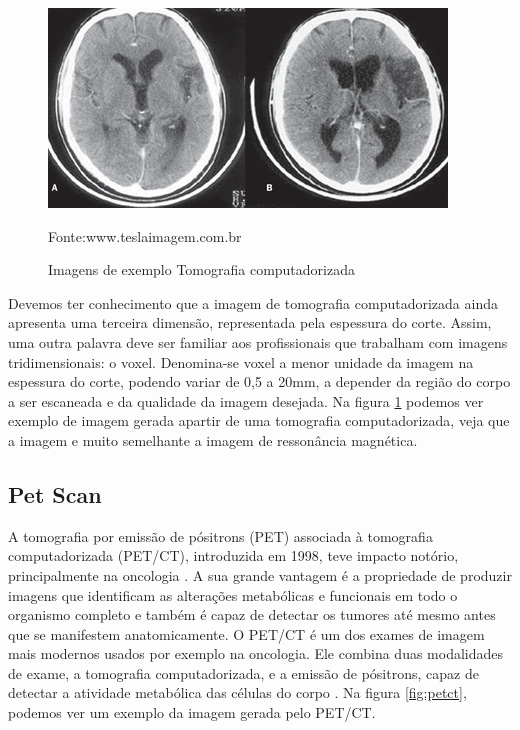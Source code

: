 \documentclass[openright]{UFRGS} %
\begin{document}
\begin{figure}[h]
    \centering
    \caption{Imagens de exemplo Tomografia computadorizada}
    \includegraphics[scale=0.60]{figuras/tomografia-computadorizada-do-cranio-tesla-imagem.jpg}
    \centerline{Fonte:www.teslaimagem.com.br}
    \label{fig:tomocomp}
\end{figure}

Devemos ter conhecimento que a imagem de tomografia computadorizada ainda apresenta uma terceira dimensão, representada pela espessura do corte. Assim, uma outra palavra deve ser familiar aos profissionais que trabalham com imagens tridimensionais: o voxel. Denomina-se voxel a menor unidade da imagem na espessura do corte, podendo variar de 0,5 a 20mm, a depender da região do corpo a ser escaneada e da qualidade da imagem desejada. Na figura \ref{fig:tomocomp} podemos ver exemplo de imagem gerada apartir de uma  tomografia computadorizada, veja que  a imagem e muito semelhante a imagem de ressonância magnética.




\subsection{Pet Scan}
A tomografia por emissão de pósitrons (PET) associada à tomografia computadorizada (PET/CT), introduzida em 1998, teve impacto notório, principalmente na oncologia \cite{parks1988cerebral}. A sua grande vantagem é a propriedade de produzir imagens que identificam as alterações metabólicas e funcionais em todo o organismo completo e também é capaz de detectar os tumores até mesmo antes que se manifestem anatomicamente. O PET/CT é um dos exames de imagem mais modernos usados  por exemplo na oncologia. Ele combina duas modalidades de exame, a tomografia computadorizada, e a emissão de pósitrons, capaz de detectar a atividade metabólica das células do corpo \cite{parks1988cerebral}. Na figura \ref{fig:petct}, podemos ver um exemplo da imagem gerada pelo PET/CT.
\end{document}

